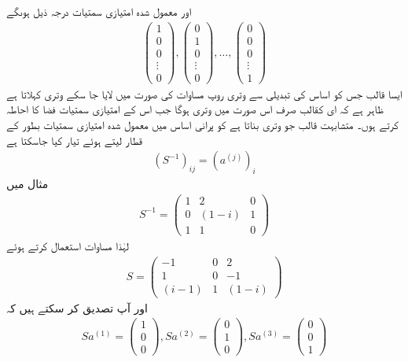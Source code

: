 اور معمول شدہ امتیازی سمتیات درجہ ذیل ہوںگے
\begin{align}
	\begin{pmatrix}
		1\\0\\0\\ \vdots\\0
	\end{pmatrix}
	,
	\begin{pmatrix}
		0\\1\\0\\\vdots\\0
	\end{pmatrix}
	, \dots,
	\begin{pmatrix}
		0\\0\\0\\\vdots\\1
	\end{pmatrix}
\end{align}
ایسا قالب جس کو اساس کی تبدیلی سے وتری روپ مساوات  کی صورت میں لایا جا سکے وتری کہلاتا ہے ظاہر ہے کہ ای کقالب صرف اس صورت میں وتری ہوگا جب اس کے امتیازی سمتیات فضا کا احاطہ کرتے ہوں۔ متشابہت قالب جو وتری بناتا ہے کو پرانی اساس میں معمول شدہ امتیازی سمتیات بطور  کے قطار لیتے ہوئے تیار کیا جاسکتا ہے
\begin{align}
	(S^{-1})_{ij} = (a^{(j)})_i
\end{align}
مثال میں
\begin{align*}
	S^{-1} =
	\begin{pmatrix}
		1 & 2 & 0\\
		0 & (1-i) & 1\\
		1 & 1 & 0
	\end{pmatrix}
\end{align*}
لہٰذا مساوات  استعمال کرتے ہوئے
\begin{align*}
	S=
	\begin{pmatrix}
		-1 & 0 & 2\\
		1 & 0 & -1\\
		(i-1) & 1 & (1-i)
	\end{pmatrix}
\end{align*}
اور آپ تصدیق کر سکتے ہیں کہ
\begin{align*}
	Sa^{(1)}=
	\begin{pmatrix}
		1\\0\\0
	\end{pmatrix}
	,
	Sa^{(2)}=
	\begin{pmatrix}
		0\\1\\0
	\end{pmatrix}
	,
	Sa^{(3)}=
	\begin{pmatrix}
		0\\0\\1
	\end{pmatrix}
\end{align*}
